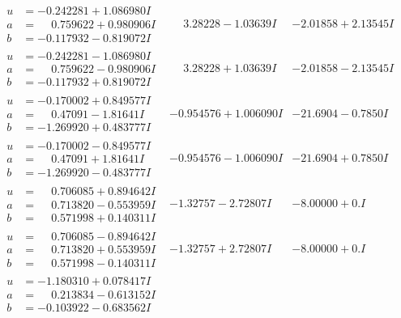 \documentclass[1p]{elsarticle_modified}
\theoremstyle{definition}
\begin{document}
$$\begin{array}{c|c|c}
\begin{aligned}
u &= -0.242281 + 1.086980 I \\
a &= \phantom{-}0.759622 + 0.980906 I \\
b &= -0.117932 - 0.819072 I\end{aligned}
 & \phantom{-}3.28228 - 1.03639 I & -2.01858 + 2.13545 I \\ \hline\begin{aligned}
u &= -0.242281 - 1.086980 I \\
a &= \phantom{-}0.759622 - 0.980906 I \\
b &= -0.117932 + 0.819072 I\end{aligned}
 & \phantom{-}3.28228 + 1.03639 I & -2.01858 - 2.13545 I \\ \hline\begin{aligned}
u &= -0.170002 + 0.849577 I \\
a &= \phantom{-}0.47091 - 1.81641 I \\
b &= -1.269920 + 0.483777 I\end{aligned}
 & -0.954576 + 1.006090 I & -21.6904 - 0.7850 I \\ \hline\begin{aligned}
u &= -0.170002 - 0.849577 I \\
a &= \phantom{-}0.47091 + 1.81641 I \\
b &= -1.269920 - 0.483777 I\end{aligned}
 & -0.954576 - 1.006090 I & -21.6904 + 0.7850 I \\ \hline\begin{aligned}
u &= \phantom{-}0.706085 + 0.894642 I \\
a &= \phantom{-}0.713820 - 0.553959 I \\
b &= \phantom{-}0.571998 + 0.140311 I\end{aligned}
 & -1.32757 - 2.72807 I & -8.00000 + 0. I\phantom{ +0.000000I} \\ \hline\begin{aligned}
u &= \phantom{-}0.706085 - 0.894642 I \\
a &= \phantom{-}0.713820 + 0.553959 I \\
b &= \phantom{-}0.571998 - 0.140311 I\end{aligned}
 & -1.32757 + 2.72807 I & -8.00000 + 0. I\phantom{ +0.000000I} \\ \hline\begin{aligned}
u &= -1.180310 + 0.078417 I \\
a &= \phantom{-}0.213834 - 0.613152 I \\
b &= -0.103922 - 0.683562 I\end{aligned}

\end{array}$$
\end{document}

